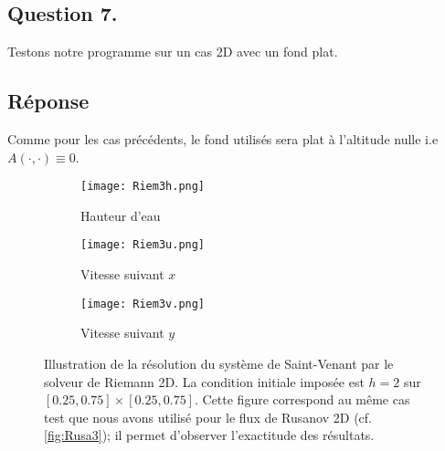 \documentclass[
	french,
	11pt, %
]{fphw}
\begin{document}
\subsection*{Question 7.}

\begin{problem}
	Testons notre programme sur un cas 2D avec un fond plat.
\end{problem}

\subsection*{Réponse} 
Comme pour les cas précédents, le fond utilisés sera plat à l'altitude nulle i.e $A(\cdot,\cdot) \equiv 0$. 


\begin{figure}[H]
	\centering
	\begin{subfigure}{0.32\textwidth}
		\centering
		\texttt{[image: Riem3h.png]}
		\caption{Hauteur d'eau}
		\label{fig:Riem3h}
	\end{subfigure}
	\begin{subfigure}{0.32\textwidth}
		\centering
		\texttt{[image: Riem3u.png]}
		\caption{Vitesse suivant $x$}
		\label{fig:Riem3u}
	\end{subfigure}
	\begin{subfigure}{0.32\textwidth}
		\centering
		\texttt{[image: Riem3v.png]}
		\caption{Vitesse suivant $y$}
		\label{fig:Riem3v}
	\end{subfigure}
	\caption{Illustration de la résolution du système de Saint-Venant par le solveur de Riemann 2D. La condition initiale imposée est $ h = 2$ sur $[0.25,0.75]\times[0.25,0.75]$. Cette figure correspond au même cas test que nous avons utilisé pour le flux de Rusanov 2D (cf. \cref{fig:Rusa3}); il permet d'observer l'exactitude des résultats.}
	\label{fig:Riem3}
\end{figure}
\end{document}
